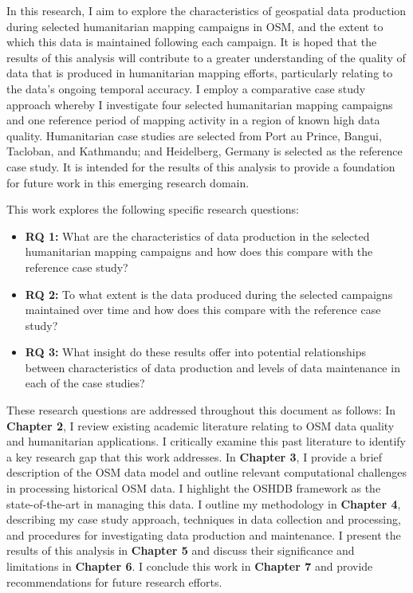 In this research, I aim to explore the characteristics of geospatial data production during selected humanitarian mapping campaigns in OSM, and the extent to which this data is maintained following each campaign. It is hoped that the results of this analysis will contribute to a greater understanding of the quality of data that is produced in humanitarian mapping efforts, particularly relating to the data’s ongoing temporal accuracy. I employ a comparative case study approach whereby I investigate four selected humanitarian mapping campaigns and one reference period of mapping activity in a region of known high data quality. Humanitarian case studies are selected from Port au Prince, Bangui, Tacloban, and Kathmandu; and Heidelberg, Germany is selected as the reference case study. It is intended for the results of this analysis to provide a foundation for future work in this emerging research domain. 

This work explores the following specific research questions: 

\begin{itemize}
    \item \textbf{RQ 1:} What are the characteristics of data production in the selected humanitarian mapping campaigns and how does this compare with the reference case study?
    \item \textbf{RQ 2:} To what extent is the data produced during the selected campaigns maintained over time and how does this compare with the reference case study? 
    \item \textbf{RQ 3:} What insight do these results offer into potential relationships between characteristics of data production and levels of data maintenance in each of the case studies? 
\end{itemize}

These research questions are addressed throughout this document as follows: In \textbf{Chapter 2}, I review existing academic literature relating to OSM data quality and humanitarian applications. I critically examine this past literature to identify a key research gap that this work addresses. In \textbf{Chapter 3}, I provide a brief description of the OSM data model and outline relevant computational challenges in processing historical OSM data. I highlight the OSHDB framework \parencite{raifer_oshdb_2019} as the state-of-the-art in managing this data. I outline my methodology in \textbf{Chapter 4}, describing my case study approach, techniques in data collection and processing, and procedures for investigating data production and maintenance. I present the results of this analysis in \textbf{Chapter 5} and discuss their significance and limitations in \textbf{Chapter 6}. I conclude this work in \textbf{Chapter 7} and provide recommendations for future research efforts. 

